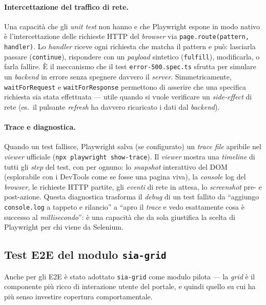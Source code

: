 \paragraph{Intercettazione del traffico di rete.} Una capacità che gli \emph{unit test} non hanno e che Playwright espone in modo nativo è l'intercettazione delle richieste HTTP del \emph{browser} via \texttt{page.route(pattern, handler)}. Lo \emph{handler} riceve ogni richiesta che matcha il pattern e può: lasciarla passare (\texttt{continue}), rispondere con un \emph{payload} sintetico (\texttt{fulfill}), modificarla, o farla fallire. È il meccanismo che il test \texttt{error-500.spec.ts} sfrutta per simulare un \emph{backend} in errore senza spegnere davvero il \emph{server}. Simmetricamente, \texttt{waitForRequest} e \texttt{waitForResponse} permettono di asserire che una specifica richiesta sia stata effettuata — utile quando si vuole verificare un \emph{side-effect} di rete (es.\ il pulsante \emph{refresh} ha davvero ricaricato i dati dal \emph{backend}).

\paragraph{Trace e diagnostica.} Quando un test fallisce, Playwright salva (se configurato) un \emph{trace file} apribile nel \emph{viewer} ufficiale (\texttt{npx playwright show-trace}). Il \emph{viewer} mostra una \emph{timeline} di tutti gli \emph{step} del test, con per ognuno: lo \emph{snapshot} interattivo del DOM (esplorabile con i DevTools come se fosse una pagina viva), la \emph{console} log del \emph{browser}, le richieste HTTP partite, gli \emph{eventi} di rete in attesa, lo \emph{screenshot} pre- e post-azione. Questa diagnostica trasforma il \emph{debug} di un test fallito da ``aggiungo \texttt{console.log} a tappeto e rilancio'' a ``apro il \emph{trace} e vedo esattamente cosa è successo al \emph{millisecondo}'': è una capacità che da sola giustifica la scelta di Playwright per chi viene da Selenium.

\subsection{Test E2E del modulo \texttt{sia-grid}}

Anche per gli E2E è stato adottato \texttt{sia-grid} come modulo pilota — la \emph{grid} è il componente più ricco di interazione utente del portale, e quindi quello su cui ha più senso investire copertura comportamentale.

